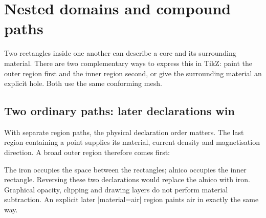 \section{Nested domains and compound paths}
\label{sec:domains}
Two rectangles inside one another can describe a core and its surrounding
material. There are two complementary ways to express this in TikZ:
paint the outer region first and the inner region second, or give the
surrounding material an explicit hole. Both use the same conforming mesh.

\subsection{Two ordinary paths: later declarations win}
With separate region paths, the physical declaration order matters.
The last region containing a point supplies its material, current density
and magnetisation direction. A broad outer region therefore comes first:
\begin{codeexample}[width=5cm]
\end{codeexample}
The iron occupies the space between the rectangles; alnico occupies the
inner rectangle. Reversing these two declarations would replace the
alnico with iron. Graphical opacity, clipping and drawing layers do not
perform material subtraction. An explicit later |material=air| region
paints air in exactly the same way.

